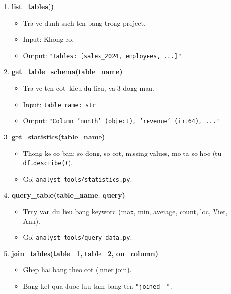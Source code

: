 \documentclass[12pt,a4paper]{article}
\begin{document}
\begin{enumerate}
  \item \textbf{list\_tables()}
        \begin{itemize}
          \item Tra ve danh sach ten bang trong project.
          \item Input: Khong co.
          \item Output: \texttt{"Tables: [sales\_2024, employees, ...]"}
        \end{itemize}

  \item \textbf{get\_table\_schema(table\_name)}
        \begin{itemize}
          \item Tra ve ten cot, kieu du lieu, va 3 dong mau.
          \item Input: \texttt{table\_name: str}
          \item Output: \texttt{"Column 'month' (object), 'revenue' (int64), ..."}
        \end{itemize}

  \item \textbf{get\_statistics(table\_name)}
        \begin{itemize}
          \item Thong ke co ban: so dong, so cot, missing values,
                mo ta so hoc (tu \texttt{df.describe()}).
          \item Goi \texttt{analyst\_tools/statistics.py}.
        \end{itemize}

  \item \textbf{query\_table(table\_name, query)}
        \begin{itemize}
          \item Truy van du lieu bang keyword (max, min, average, count,
                loc, Viet, Anh).
          \item Goi \texttt{analyst\_tools/query\_data.py}.
        \end{itemize}

  \item \textbf{join\_tables(table\_1, table\_2, on\_column)}
        \begin{itemize}
          \item Ghep hai bang theo cot (inner join).
          \item Bang ket qua duoc luu tam bang ten \texttt{"joined\_<table1>\_<table2>"}.
        \end{itemize}


\end{enumerate}
\end{document}
